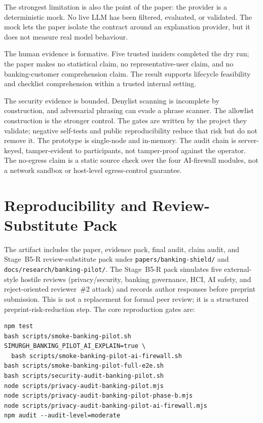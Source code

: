 \documentclass[conference]{IEEEtran}
\begin{document}
The strongest limitation is also the point of the paper: the provider is a
deterministic mock. No live LLM has been filtered, evaluated, or validated. The
mock lets the paper isolate the contract around an explanation provider, but it
does not measure real model behaviour.

The human evidence is formative. Five trusted insiders completed the dry run; the
paper makes no statistical claim, no representative-user claim, and no
banking-customer comprehension claim. The result supports lifecycle feasibility
and checklist comprehension within a trusted internal setting.

The security evidence is bounded. Denylist scanning is incomplete by
construction, and adversarial phrasing can evade a phrase scanner. The allowlist
construction is the stronger control. The gates are written by the project they
validate; negative self-tests and public reproducibility reduce that risk but do
not remove it. The prototype is single-node and in-memory. The audit chain is
server-keyed, tamper-evident to participants, not tamper-proof against the
operator. The no-egress claim is a static source check over the four AI-firewall
modules, not a network sandbox or host-level egress-control guarantee.

\section{Reproducibility and Review-Substitute Pack}

The artifact includes the paper, evidence pack, final audit, claim audit, and
Stage~B5-R review-substitute pack under \texttt{papers/banking-shield/} and
\texttt{docs/research/banking-pilot/}. The Stage~B5-R pack simulates five
external-style hostile reviews (privacy/security, banking governance, HCI, AI
safety, and reject-oriented reviewer~\#2 attack) and records author responses
before preprint submission. This is not a replacement for formal peer review; it
is a structured preprint-risk-reduction step. The core reproduction gates are:

{\scriptsize
\begin{verbatim}
npm test
bash scripts/smoke-banking-pilot.sh
SIMURGH_BANKING_PILOT_AI_EXPLAIN=true \
  bash scripts/smoke-banking-pilot-ai-firewall.sh
bash scripts/smoke-banking-pilot-full-e2e.sh
bash scripts/security-audit-banking-pilot.sh
node scripts/privacy-audit-banking-pilot.mjs
node scripts/privacy-audit-banking-pilot-phase-b.mjs
node scripts/privacy-audit-banking-pilot-ai-firewall.mjs
npm audit --audit-level=moderate
\end{verbatim}
}
\end{document}
